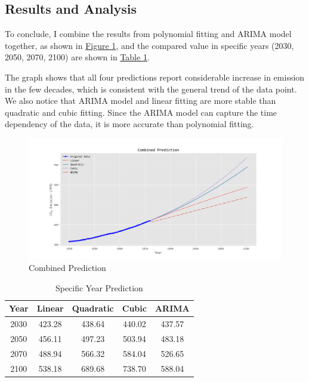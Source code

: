 \documentclass[12pt,a4paper]{article}
\begin{document}
    \subsection{Results and Analysis}
    
    To conclude, I combine the results from polynomial fitting and ARIMA model together, as shown in \hyperref[arima]{Figure \ref*{combination}}, and the compared value in specific years (2030, 2050, 2070, 2100) are shown in \hyperref[yearpred]{Table \ref*{yearpred}}.

    The graph shows that all four predictions report considerable increase in  emission in the few decades, which is consistent with the general trend of the data point. We also notice that ARIMA model and linear fitting are more stable than quadratic and cubic fitting. Since the ARIMA model can capture the time dependency of the data, it is more accurate than polynomial fitting.

    \begin{figure}[htbp]
        \centering
        \includegraphics[width=1\linewidth]{img/combination.png}
        \caption{Combined Prediction}
        \label{combination}
    \end{figure}
    
    \begin{table}[htbp]
    \renewcommand*{\arraystretch}{1.3}
    \centering
    \caption{Specific Year Prediction}
    \begin{tabular}{ccccc}
        \toprule[2pt]
        Year&Linear&Quadratic&  Cubic&  ARIMA\\
        \midrule
        2030&423.28&438.64&  440.02&  437.57\\
        2050&456.11&497.23&  503.94&  483.18\\
        2070&488.94&566.32&  584.04&  526.65\\
        2100&538.18&689.68&  738.70&  588.04\\
        \bottomrule[2pt]
    \end{tabular}
    \label{yearpred}
    \end{table}
\end{document}
